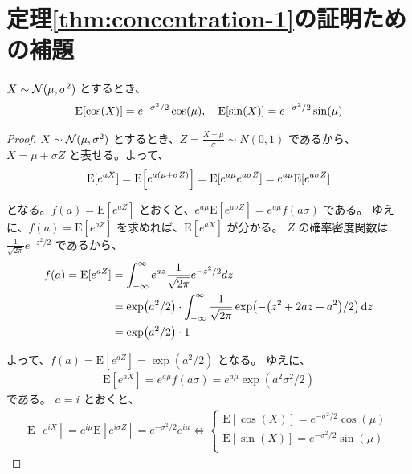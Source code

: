 \section{定理\ref{thm:concentration-1}の証明ための補題}\label{sec:prf-lemma-cos-sin-expectation}
\begin{screen}
\begin{lemma}\label{lem:cos-sin-expectation}
    $X \sim \mathcal{N}(\mu, \sigma^2)$ とするとき、
    \begin{align}
        \operatorname{E}[\cos(X)] = e^{-\sigma^2/2}\cos(\mu),\quad
        \operatorname{E}[\sin(X)] = e^{-\sigma^2/2}\sin(\mu)
    \end{align}
\end{lemma}
\end{screen}


\begin{proof}
    $X \sim \mathcal{N}(\mu, \sigma^2)$ とするとき、$Z=\frac{X-\mu}{\sigma} \sim N(0,1)$ であるから、$X=\mu+\sigma Z$ と表せる。よって、
    \begin{align}
        \mathrm{E}[e^{a X}]
        = \mathrm{E}\qty[e^{a(\mu+\sigma Z)}]
        = \mathrm{E}[e^{a \mu} e^{a \sigma Z}]
        = e^{a \mu}\mathrm{E}[e^{a \sigma Z}]
    \end{align}

    となる。$f(a)=\mathrm{E}[e^{a Z}]$ とおくと、$e^{a \mu}\mathrm{E}[e^{a \sigma Z}]= e^{a \mu} f(a \sigma)$ である。
    ゆえに、$f(a)=\mathrm{E}[e^{a Z}]$ を求めれば、$\mathrm{E}[e^{a X}]$ が分かる。
    $Z$ の確率密度関数は $\frac{1}{\sqrt{2 \pi}} e^{-z^2 / 2}$ であるから、
    \begin{align}
        f(a)
        = \mathrm{E}[e^{a Z}]
        &=\int_{-\infty}^{\infty} e^{a z} \frac{1}{\sqrt{2 \pi}} e^{-z^2 / 2} dz \\
        &=\exp(a^2/2) \cdot \int_{-\infty}^{\infty}
        \frac{1}{\sqrt{2 \pi}}\exp(-\qty(z^2+2 a z+a^2)/2) \dd{z} \\
        &=\exp(a^2/2) \cdot 1
    \end{align}
    
    よって、$f(a) = \mathrm{E}[e^{a Z}] = \exp(a^2/2)$ となる。
    ゆえに、
    \begin{align}
        \mathrm{E}[e^{a X}]
        = e^{a \mu} f(a \sigma)
        = e^{a \mu}\exp(a^2\sigma^2/2)
    \end{align}
    である。
    $a = i$ とおくと、
    \begin{align}
        \mathrm{E}[e^{iX}]
        = e^{i\mu} \mathrm{E}[e^{i\sigma Z}]
        = e^{-\sigma^2/2} e^{i\mu}
        \iff
        \begin{cases}
        \mathrm{E}[\cos(X)] = e^{-\sigma^2/2}\cos(\mu)\\
        \mathrm{E}[\sin(X)] = e^{-\sigma^2/2}\sin(\mu)\\
        \end{cases}
    \end{align}
\end{proof}



